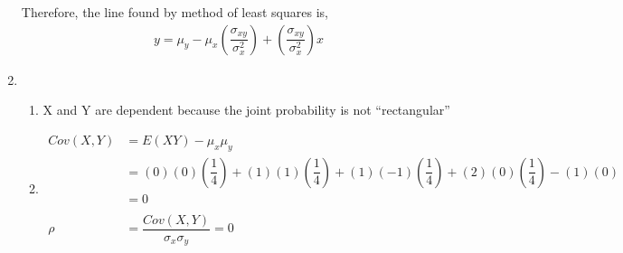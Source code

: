 \documentclass{article}
\newcommand\mfrac[2]{\left(\dfrac{#1}{#2}\right)}
\begin{document}
\begin{enumerate}
      Therefore, the line found by method of least squares is,
      \begin{align*}
       y = \mu_y - \mu_x\mfrac{\sigma_{xy}}{\sigma_x^2} + \mfrac{\sigma_{xy}}{\sigma_x^2}x
      \end{align*}



     \addtocounter{enumi}{1}
     
     \item
      \begin{enumerate}
       \item
	X and Y are dependent because the joint probability is not ``rectangular''
       
       \item
	\begin{align*}
	  Cov(X,Y) &= E(XY) - \mu_x\mu_y \\
	    &= (0)(0)\mfrac{1}{4} + (1)(1)\mfrac{1}{4} + (1)(-1)\mfrac{1}{4} + (2)(0)\mfrac{1}{4} 
	      - (1)(0) \\ 
	    &= 0 \\
	    \\
	  \rho &= \dfrac{Cov(X,Y)}{\sigma_x \sigma_y} = 0
	\end{align*}
      \end{enumerate}
    \end{enumerate}
\end{document}
